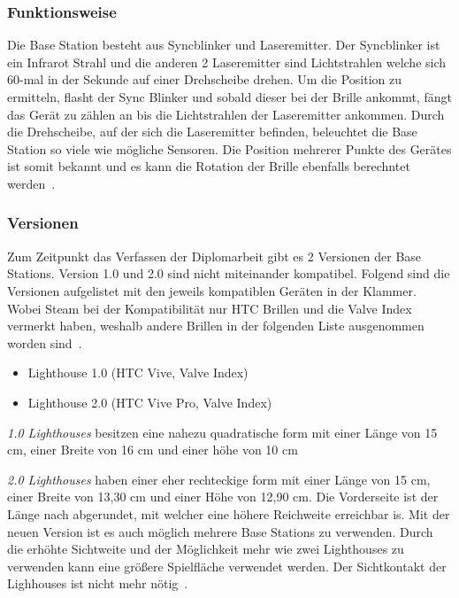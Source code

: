 \subsubsection{Funktionsweise}

Die Base Station besteht aus Syncblinker und Laseremitter.
Der Syncblinker ist ein Infrarot Strahl und die anderen 2 Laseremitter sind Lichtstrahlen welche sich 60-mal in der Sekunde auf einer Drehscheibe drehen.
Um die Position zu ermitteln, flasht der Sync Blinker und sobald dieser bei der Brille ankommt, fängt das Gerät zu zählen an bis die Lichtstrahlen der Laseremitter ankommen.
Durch die Drehscheibe, auf der sich die Laseremitter befinden, beleuchtet die Base Station so viele wie mögliche Sensoren.
Die Position mehrerer Punkte des Gerätes ist somit bekannt und es kann die Rotation der Brille ebenfalls berechntet werden~\cite{Buckley_2015, Skarredghost_2017}.

\subsubsection{Versionen}

Zum Zeitpunkt das Verfassen der Diplomarbeit gibt es 2 Versionen der Base Stations.
Version 1.0 und 2.0 sind nicht miteinander kompatibel.
Folgend sind die Versionen aufgelistet mit den jeweils kompatiblen Geräten in der Klammer.
Wobei Steam bei der Kompatibilität nur HTC Brillen und die Valve Index vermerkt haben, weshalb andere Brillen in der folgenden Liste ausgenommen worden sind~\cite{steam_lighhouse_versions}.

\begin{itemize}
    \item Lighthouse 1.0 (HTC Vive, Valve Index)
    \item Lighthouse 2.0 (HTC Vive Pro, Valve Index)
\end{itemize}

\emph{1.0 Lighthouses} besitzen eine nahezu quadratische form mit einer Länge von 15 cm, einer Breite von 16 cm und einer höhe von 10 cm

\emph{2.0 Lighthouses} haben einer eher rechteckige form mit einer Länge von 15 cm, einer Breite von 13,30 cm und einer Höhe von 12,90 cm.
Die Vorderseite ist der Länge nach abgerundet, mit welcher eine höhere Reichweite erreichbar is.
Mit der neuen Version ist es auch möglich mehrere Base Stations zu verwenden.
Durch die erhöhte Sichtweite und der Möglichkeit mehr wie zwei Lighthouses zu verwenden kann eine größere Spielfläche verwendet werden.
Der Sichtkontakt der Lighhouses ist nicht mehr nötig~\cite{Cale_2019}.


